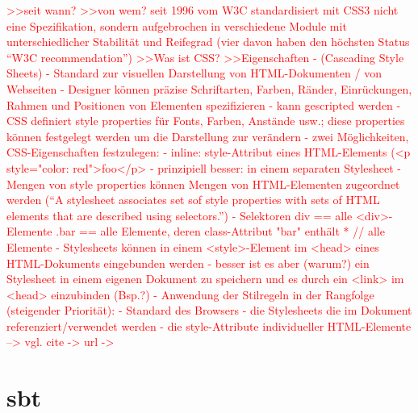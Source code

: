 \documentclass[a4paper, 12pt, hidelinks, listof=totoc, listoftables=totoc, bibliography=totoc]{scrreprt}
\newcommand{\TODO}[1]{\textcolor{red}{#1}\newline}
\begin{document}
\TODO{>>seit wann?
>>von wem?
  seit 1996 vom W3C standardisiert
  mit CSS3 nicht eine Spezifikation, sondern aufgebrochen in verschiedene Module mit unterschiedlicher Stabilität und Reifegrad (vier davon haben den höchsten Status "`W3C recommendation"')
>>Was ist CSS?
}
\TODO{>>Eigenschaften}
\TODO{  - (Cascading Style Sheets)}
\TODO{  - Standard zur visuellen Darstellung von HTML-Dokumenten / von Webseiten}
\TODO{  - Designer können präzise Schriftarten, Farben, Ränder, Einrückungen, Rahmen und Positionen von Elementen spezifizieren}
\TODO{  - kann gescripted werden}
\TODO{  - CSS definiert style properties für Fonts, Farben, Anstände usw.; diese properties können festgelegt werden um die Darstellung zur verändern}
\TODO{  - zwei Möglichkeiten, CSS-Eigenschaften festzulegen:}
\TODO{    - inline: style-Attribut eines HTML-Elements (<p style="color: red">foo</p>}
\TODO{    - prinzipiell besser: in einem separaten Stylesheet}
\TODO{      - Mengen von style properties können Mengen von HTML-Elementen zugeordnet werden ("`A stylesheet associates set sof style properties with sets of HTML elements that are described using selectors."')}
\TODO{      - Selektoren}
\TODO{        div  ==  alle <div>-Elemente}
\TODO{        .bar  ==  alle Elemente, deren class-Attribut "bar" enthält}
\TODO{        * // alle Elemente}
\TODO{      - Stylesheets können in einem <style>-Element im <head> eines HTML-Dokuments eingebunden werden}
\TODO{      - besser ist es aber (warum?) ein Stylesheet in einem eigenen Dokument zu speichern und es durch ein <link> im <head> einzubinden (Bsp.?)}
\TODO{  - Anwendung der Stilregeln in der Rangfolge (steigender Priorität):}
\TODO{    - Standard des Browsers}
\TODO{    - die Stylesheets die im Dokument referenziert/verwendet werden}
\TODO{    - die style-Attribute individueller HTML-Elemente}
\TODO{  -->  vgl. cite -> %
}
\TODO{  url -> %
}




\section{sbt}\label{sec:sbt}
\end{document}
